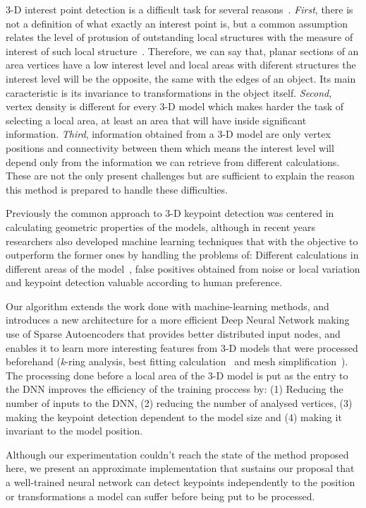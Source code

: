 \documentclass{comjnl}
\begin{document}
3-D interest point detection is a difficult task for several reasons~\cite{Sipiran2011, Teran2014}.
\textit{First}, there is not a definition of what exactly an interest point is, but a common
assumption relates the level of protusion of outstanding local structures
with the measure of interest of such local structure~\cite{Sipiran2011}.
Therefore, we can say that, planar sections of an area
vertices have a low interest level and local areas with diferent
structures the interest level will be the opposite, the same with
the edges of an object. Its main caracteristic is its
invariance to transformations in the object itself. \textit{Second}, vertex 
density is different for every 3-D model which makes harder the task of
selecting a local area, at least an area that will have inside significant
information. \textit{Third}, information obtained from a 3-D model
are only vertex positions and connectivity between them which means
the interest level will depend only from the information we can
retrieve from different calculations. These are not the only present challenges
but are sufficient to explain the reason this method is prepared to
handle these difficulties.

Previously the common approach to 3-D keypoint detection was
centered in calculating geometric properties of the models, although
in recent years researchers also developed machine learning techniques
that with the objective to outperform the former ones by handling the
problems of: Different calculations in different areas of the model~\cite{Lin2016},
false positives obtained from noise or local variation and keypoint
detection valuable according to human preference. 

Our algorithm extends the work done with machine-learning methods,
and introduces a new architecture for a more efficient Deep Neural Network
making use of Sparse Autoencoders that provides better distributed input
nodes, and enables it to learn more interesting features from 3-D models
that were processed beforehand (\textit{k}-ring analysis, best fitting
calculation~\cite{Sipiran2011} and mesh simplification~\cite{Lee2005}).
The processing done before a local area of the 3-D model is put as the
entry to the DNN improves the efficiency of the training proccess by:
(1) Reducing the number of inputs to the DNN, (2) reducing the number of
analysed vertices, (3) making the keypoint detection dependent to the
model size and (4) making it invariant to the model position. 

Although our experimentation couldn't reach the state of the method proposed
here, we present an approximate implementation that sustains our proposal that
a well-trained neural network can detect keypoints independently to the position
or transformations a model can suffer before being put to be processed. 
\end{document}
